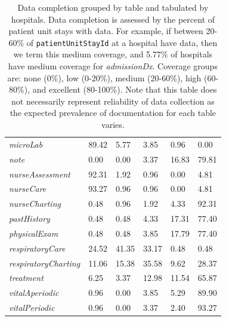 \documentclass[english]{article}
\newcommand{\colname}[1]{\texttt{#1}}
\newcommand{\tblname}[1]{\emph{#1}}
\begin{document}
\begin{table}
\begin{tabular}{l|p{1.25cm}|p{1.0cm}|p{1.25cm}|p{1.25cm}|p{1.25cm}}
\tblname{microLab}                       & 89.42 &  5.77 &  3.85 &  0.96 &  0.00 \\
\tblname{note}                           &  0.00 &  0.00 &  3.37 & 16.83 & 79.81 \\
\tblname{nurseAssessment}                & 92.31 &  1.92 &  0.96 &  0.00 &  4.81 \\
\tblname{nurseCare}                      & 93.27 &  0.96 &  0.96 &  0.00 &  4.81 \\
\tblname{nurseCharting}                  &  0.48 &  0.96 &  1.92 &  4.33 & 92.31 \\
\tblname{pastHistory}                    &  0.48 &  0.48 &  4.33 & 17.31 & 77.40 \\
\tblname{physicalExam}                   &  0.48 &  0.48 &  3.85 & 17.79 & 77.40 \\
\tblname{respiratoryCare}                & 24.52 & 41.35 & 33.17 &  0.48 &  0.48 \\
\tblname{respiratoryCharting}            & 11.06 & 15.38 & 35.58 &  9.62 & 28.37 \\
\tblname{treatment}                      &  6.25 &  3.37 & 12.98 & 11.54 & 65.87 \\
\tblname{vitalAperiodic}                 &  0.96 &  0.00 &  3.85 &  5.29 & 89.90 \\
\tblname{vitalPeriodic}                  &  0.96 &  0.00 &  3.37 &  2.40 & 93.27 \\
\hline
\end{tabular}
\caption{Data completion grouped by table and tabulated by hospitals.
Data completion is assessed by the percent of patient unit stays with
data. For example, if between 20-60\% of \colname{patientUnitStayId} at a
hospital have data, then we term this medium coverage, and 5.77\% of
hospitals have medium coverage for \tblname{admissionDx}.
Coverage groups are: none (0\%), low (0-20\%), medium (20-60\%), high (60-80\%), and excellent (80-100\%).
Note that this table does not necessarily represent reliability of data collection
as the expected prevalence of documentation for each table varies.
\label{tab:data_completion}}
\end{table}

\end{document}
